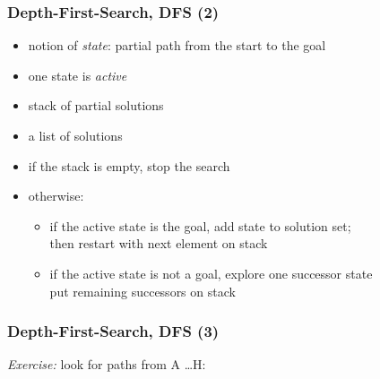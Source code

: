 \begin{frame}[fragile]\frametitle{Depth-First-Search, DFS (2)}


\begin{itemize}
\item notion of \emph{state}: partial path from the start to the goal
\item one state is \emph{active}
\item stack of partial solutions
\item a list of solutions
\end{itemize}

\begin{itemize}
\item if the stack is empty, stop the search
\item otherwise:
  \begin{itemize}
  \item if the active state is the goal, add state to solution set;\\
    then restart with next element on stack
  \item if the active state is not a goal, explore one successor state\\
    put remaining successors on stack
  \end{itemize}
\end{itemize}

\end{frame}



\begin{frame}[fragile]\frametitle{Depth-First-Search, DFS (3)}

\emph{Exercise:} look for paths from A \dots H:


\begin{columns}[t]




\end{columns}

\end{frame}



